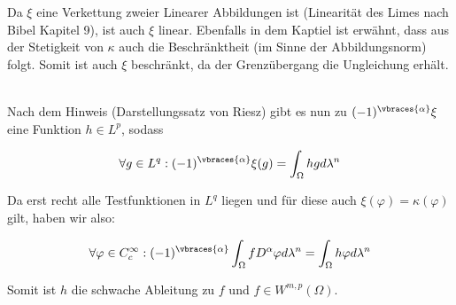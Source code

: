 \begin{solution}
Da $\xi$ eine Verkettung zweier Linearer Abbildungen ist (Linearität des Limes
nach Bibel Kapitel 9), ist auch $\xi$ linear. Ebenfalls in dem Kaptiel ist
erwähnt, dass aus der Stetigkeit von $\kappa$ auch die Beschränktheit
(im Sinne der Abbildungsnorm) folgt.
Somit ist auch $\xi$ beschränkt, da der Grenzübergang die Ungleichung erhält.

\\

Nach dem Hinweis (Darstellungssatz von Riesz) gibt es nun zu
$(-1)^{\vbraces{\alpha}}\xi$ eine Funktion $h \in L^p$, sodass

\begin{equation*}
  \forall g \in L^q: (-1)^{\vbraces{\alpha}}\xi(g)=\int_{\Omega}hgd\lambda^n
\end{equation*}

Da erst recht alle Testfunktionen in $L^q$ liegen und für diese auch
$\xi(\varphi) = \kappa(\varphi)$ gilt, haben wir also:

\begin{equation*}
  \forall \varphi\in C^{\infty}_c:(-1)^{\vbraces{\alpha}}\int_{\Omega}
  fD^{\alpha}\varphi d\lambda^n = \int_{\Omega}h\varphi d\lambda^n

\end{equation*}

Somit ist $h$ die schwache Ableitung zu $f$ und $f\in W^{m,p}(\Omega)$.

\end{solution}

